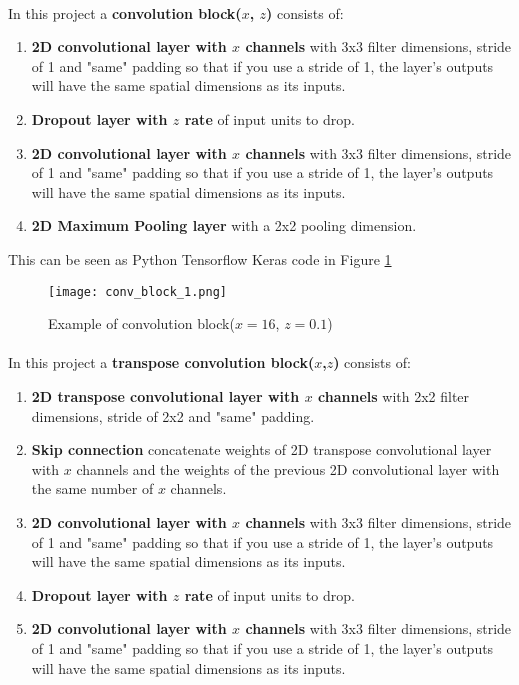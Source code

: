 \paragraph{}
In this project a \textbf{convolution block($x$, $z$)} consists of:
    \begin{enumerate}
        \item \textbf{2D convolutional layer with $x$ channels} with 3x3 filter dimensions, stride of 1 and "same" padding so that if you use a stride of 1, the layer's outputs will have the same spatial dimensions as its inputs.
        \item \textbf{Dropout layer with $z$ rate} of input units to drop.
        \item \textbf{2D convolutional layer with $x$ channels} with 3x3 filter dimensions, stride of 1 and "same" padding so that if you use a stride of 1, the layer's outputs will have the same spatial dimensions as its inputs.
        \item \textbf{2D Maximum Pooling layer} with a 2x2 pooling dimension.
    \end{enumerate}
This can be seen as Python Tensorflow Keras code in Figure \ref{conv_block_1}
\begin{figure}[hbt!]
    \centering
    \texttt{[image: conv\_block\_1.png]}
    \caption{Example of convolution block($x=16$, $z=0.1$)}
    \label{conv_block_1}
\end{figure}

\paragraph{}
In this project a \textbf{transpose convolution block($x$,$z$)} consists of:
    \begin{enumerate}
        \item \textbf{2D transpose convolutional layer with $x$ channels} with 2x2 filter dimensions, stride of 2x2 and "same" padding.
        \item \textbf{Skip connection} concatenate weights of 2D transpose convolutional layer with $x$ channels and the weights of the previous 2D convolutional layer with the same number of $x$ channels.
        \item \textbf{2D convolutional layer with $x$ channels} with 3x3 filter dimensions, stride of 1 and "same" padding so that if you use a stride of 1, the layer's outputs will have the same spatial dimensions as its inputs.
        \item \textbf{Dropout layer with $z$ rate} of input units to drop.
        \item \textbf{2D convolutional layer with $x$ channels} with 3x3 filter dimensions, stride of 1 and "same" padding so that if you use a stride of 1, the layer's outputs will have the same spatial dimensions as its inputs.
    \end{enumerate}  

